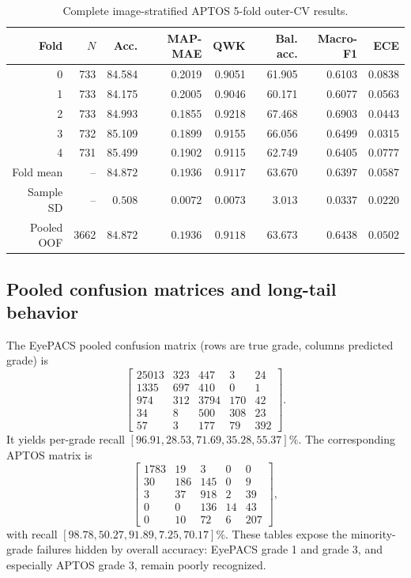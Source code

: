 \documentclass[10pt,twocolumn,letterpaper]{article}
\begin{document}
\begin{table}[t]
  \centering
  \caption{Complete image-stratified APTOS 5-fold outer-CV results.}
  \label{tab:aptos-folds}
  \small
  \setlength{\tabcolsep}{7pt}
  \begin{tabular}{@{}rrrrrrrr@{}}
    \toprule
    Fold & $N$ & Acc. & MAP-MAE & QWK & Bal. acc. & Macro-F1 & ECE \\
    \midrule
    0 & 733 & 84.584 & 0.2019 & 0.9051 & 61.905 & 0.6103 & 0.0838 \\
    1 & 733 & 84.175 & 0.2005 & 0.9046 & 60.171 & 0.6077 & 0.0563 \\
    2 & 733 & 84.993 & 0.1855 & 0.9218 & 67.468 & 0.6903 & 0.0443 \\
    3 & 732 & 85.109 & 0.1899 & 0.9155 & 66.056 & 0.6499 & 0.0315 \\
    4 & 731 & 85.499 & 0.1902 & 0.9115 & 62.749 & 0.6405 & 0.0777 \\
    \midrule
    Fold mean & -- & $84.872$ & $0.1936$ & $0.9117$ & $63.670$ & $0.6397$ & $0.0587$ \\
    Sample SD & -- & $0.508$ & $0.0072$ & $0.0073$ & $3.013$ & $0.0337$ & $0.0220$ \\
    Pooled OOF & 3662 & $84.872$ & $0.1936$ & $0.9118$ & $63.673$ & $0.6438$ & $0.0502$ \\
    \bottomrule
  \end{tabular}
\end{table}

\subsection{Pooled confusion matrices and long-tail behavior}

The EyePACS pooled confusion matrix (rows are true grade, columns predicted
grade) is
\begin{equation*}
\begin{bmatrix}
25013&323&447&3&24\\
1335&697&410&0&1\\
974&312&3794&170&42\\
34&8&500&308&23\\
57&3&177&79&392
\end{bmatrix}.
\end{equation*}
It yields per-grade recall
$[96.91,28.53,71.69,35.28,55.37]\%$.  The corresponding APTOS matrix is
\begin{equation*}
\begin{bmatrix}
1783&19&3&0&0\\
30&186&145&0&9\\
3&37&918&2&39\\
0&0&136&14&43\\
0&10&72&6&207
\end{bmatrix},
\end{equation*}
with recall $[98.78,50.27,91.89,7.25,70.17]\%$.  These tables expose the
minority-grade failures hidden by overall accuracy: EyePACS grade 1 and grade 3,
and especially APTOS grade 3, remain poorly recognized.
\end{document}
